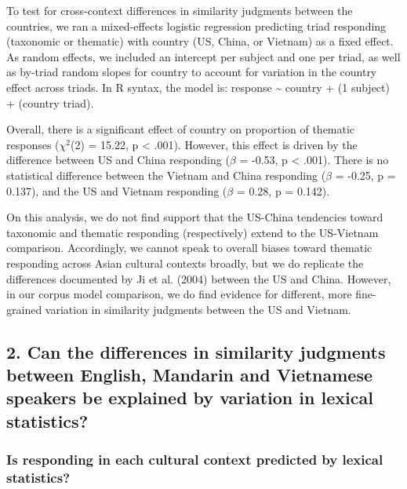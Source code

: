 \documentclass[10pt, letterpaper]{article}
\begin{document}
To test for cross-context differences in similarity judgments between
the countries, we ran a mixed-effects logistic regression predicting
triad responding (taxonomic or thematic) with country (US, China, or
Vietnam) as a fixed effect. As random effects, we included an intercept
per subject and one per triad, as well as by-triad random slopes for
country to account for variation in the country effect across triads. In
R syntax, the model is: response \textasciitilde{} country + (1
\textbar{} subject) + (country \textbar{} triad).

Overall, there is a significant effect of country on proportion of
thematic responses (\(\chi^2\)(2) = 15.22, p \textless{} .001). However,
this effect is driven by the difference between US and China responding
(\(\beta\) = -0.53, p \textless{} .001). There is no statistical
difference between the Vietnam and China responding (\(\beta\) = -0.25,
p = 0.137), and the US and Vietnam responding (\(\beta\) = 0.28, p =
0.142).

On this analysis, we do not find support that the US-China tendencies
toward taxonomic and thematic responding (respectively) extend to the
US-Vietnam comparison. Accordingly, we cannot speak to overall biases
toward thematic responding across Asian cultural contexts broadly, but
we do replicate the differences documented by Ji et al. (2004) between
the US and China. However, in our corpus model comparison, we do find
evidence for different, more fine-grained variation in similarity
judgments between the US and Vietnam.

\hypertarget{can-the-differences-in-similarity-judgments-between-english-mandarin-and-vietnamese-speakers-be-explained-by-variation-in-lexical-statistics}{%
\subsection{2. Can the differences in similarity judgments between
English, Mandarin and Vietnamese speakers be explained by variation in
lexical
statistics?}\label{can-the-differences-in-similarity-judgments-between-english-mandarin-and-vietnamese-speakers-be-explained-by-variation-in-lexical-statistics}}

\hypertarget{is-responding-in-each-cultural-context-predicted-by-lexical-statistics}{%
\subsubsection{Is responding in each cultural context predicted by
lexical
statistics?}\label{is-responding-in-each-cultural-context-predicted-by-lexical-statistics}}
\end{document}
